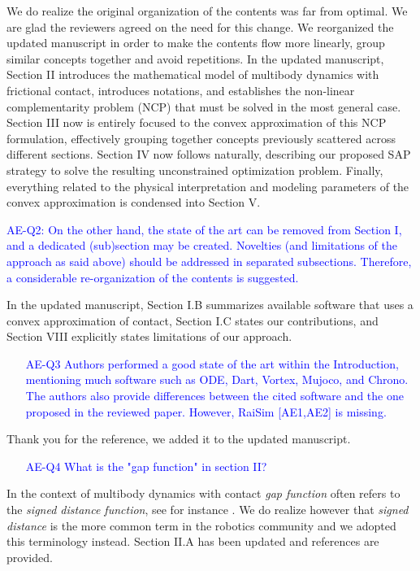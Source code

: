 We do realize the original organization of the contents was far from optimal. We
are glad the reviewers agreed on the need for this change. We reorganized the
updated manuscript in order to make the contents flow more linearly, group
similar concepts together and avoid repetitions. In the updated manuscript, Section II
introduces the mathematical model of multibody dynamics with frictional contact,
introduces notations, and establishes the non-linear complementarity problem (NCP)
that must be solved in the most general case. Section III now is entirely
focused to the convex approximation of this NCP formulation, effectively
grouping together concepts previously scattered across different sections.
Section IV now follows naturally, describing our proposed SAP strategy to solve
the resulting unconstrained optimization problem. Finally, everything related to
the physical interpretation and modeling parameters of the convex approximation
is condensed into Section V.

\vspace{5mm}
\textcolor{blue}{AE-Q2: On the other hand, the state of the art can be removed from
Section I, and a dedicated (sub)section may be created. Novelties (and
limitations of the approach as said above) should be addressed in separated
subsections. Therefore, a considerable re-organization of the contents is
suggested.}

In the updated manuscript, Section I.B summarizes available software that uses a
convex approximation of contact, Section I.C states our contributions, and
Section VIII explicitly states limitations of our approach.

\textcolor{blue}{
\begin{itemize}
    \item[AE-Q3] Authors performed a good state of the art within the Introduction,
    mentioning much software such as ODE, Dart, Vortex, Mujoco, and Chrono. The
    authors also provide differences between the cited software and the one
    proposed in the reviewed paper. However, RaiSim [AE1,AE2] is
    missing.\end{itemize}}

Thank you for the reference, we added it to the updated manuscript.

\textcolor{blue}{
\begin{itemize}
    \item[AE-Q4] What is the "gap function" in section II?\end{itemize}}
    
In the context of multibody dynamics with contact \emph{gap function} often
refers to the \emph{signed distance function}, see for instance
\cite{bib:negrut2018posing, bib:duriez2005realistic,
bib:laursen2003computational}. We do realize however that \emph{signed distance}
is the more common term in the robotics community and we adopted this
terminology instead. Section II.A has been updated and references are provided.

